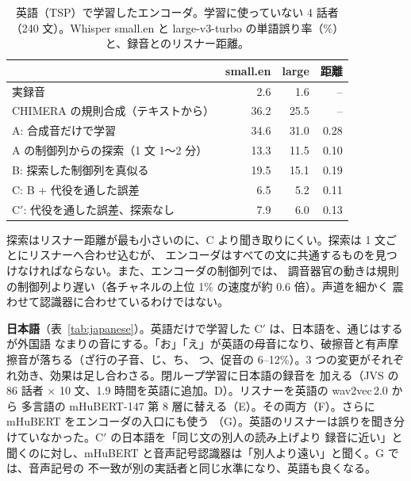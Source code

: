 \documentclass[10pt,a4paper,twocolumn]{article}
\begin{document}
\begin{table}[t]
\centering\footnotesize\setlength{\tabcolsep}{3pt}
\caption{英語（TSP）で学習したエンコーダ。学習に使っていない 4 話者（240 文）。Whisper small.en と
large-v3-turbo の単語誤り率（\%）と、録音とのリスナー距離。}
\label{tab:english}
\begin{tabular}{@{}lrrr@{}}
\toprule
& small.en & large & 距離\\
\midrule
実録音 & 2.6 & 1.6 & --\\
CHIMERA の規則合成（テキストから） & 36.2 & 25.5 & --\\
A: 合成音だけで学習 & 34.6 & 31.0 & 0.28\\
A の制御列からの探索（1 文 1〜2 分） & 13.3 & 11.5 & 0.10\\
B: 探索した制御列を真似る & 19.5 & 15.1 & 0.19\\
C: B + 代役を通した誤差 & 6.5 & 5.2 & 0.11\\
C$'$: 代役を通した誤差、探索なし & 7.9 & 6.0 & 0.13\\
\bottomrule
\end{tabular}
\end{table}

探索はリスナー距離が最も小さいのに、C より聞き取りにくい。探索は 1 文ごとにリスナーへ合わせ込むが、
エンコーダはすべての文に共通するものを見つけなければならない。また、エンコーダの制御列では、
調音器官の動きは規則の制御列より遅い（各チャネルの上位 1\% の速度が約 0.6 倍）。声道を細かく
震わせて認識器に合わせているわけではない。

\textbf{日本語}（表~\ref{tab:japanese}）。英語だけで学習した C$'$ は、日本語を、通じはするが外国語
なまりの音にする。「お」「え」が英語の母音になり、破擦音と有声摩擦音が落ちる（ざ行の子音、じ、ち、
つ、促音の 6--12\%）。3 つの変更がそれぞれ効き、効果は足し合わさる。閉ループ学習に日本語の録音を
加える（JVS の 86 話者 $\times$ 10 文、1.9 時間を英語に追加。D）。リスナーを英語の wav2vec\,2.0 から
多言語の mHuBERT-147 第 8 層に替える（E）。その両方（F）。さらに mHuBERT をエンコーダの入口にも使う
（G）。英語のリスナーは誤りを聞き分けていなかった。C$'$ の日本語を「同じ文の別人の読み上げより
録音に近い」と聞くのに対し、mHuBERT と音声記号認識器は「別人より遠い」と聞く。G では、音声記号の
不一致が別の実話者と同じ水準になり、英語も良くなる。
\end{document}
